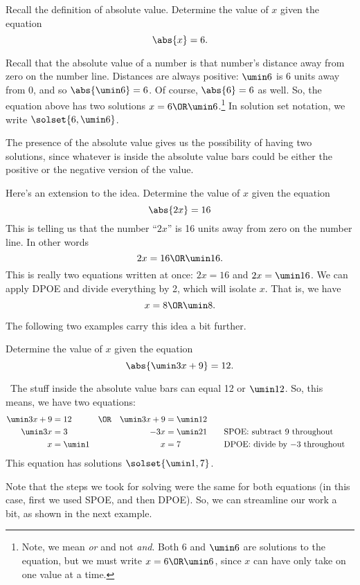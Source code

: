 \begin{boxexplore}
Recall the definition of absolute value. Determine the value of $x$ given the equation \[\abs{x} = 6.\]
\end{boxexplore} %

Recall that the absolute value of a number is that number's distance away from zero on the number line. Distances are always positive: $\umin6$ is 6 units away from 0, and so $\abs{\umin6}=6$. Of course, $\abs{6} = 6$ as well. So, the equation above has two solutions $x = 6 \OR \umin6$.\footnote{Note, we mean \textit{or} and not \textit{and}. Both 6 and $\umin6$ are solutions to the equation, but we must write $x=6 \OR \umin6$, since $x$ can have only take on one value at a time.} In solution set notation, we write $\solset{6, \umin6}$.

The presence of the absolute value gives us the possibility of having two solutions, since whatever is inside the absolute value bars could be either the positive or the negative version of the value.

Here's an extension to the idea. Determine the value of $x$ given the equation \[\abs{2x} = 16\]
This is telling us that the number ``$2x$'' is 16 units away from zero on the number line. In other words \[2x = 16 \OR \umin16.\]
This is really two equations written at once: $2x = 16$ and $2x = \umin16$. We can apply DPOE and divide everything by 2, which will isolate $x$. That is, we have \[x = 8 \OR \umin8.\]

The following two examples carry this idea a bit further.

\begin{boxex}
Determine the value of $x$ given the equation \[\abs{\umin3x+9} = 12.\]

\exsoln\ The stuff inside the absolute value bars can equal 12 or $\umin12$. So, this means, we have two equations:
\[\begin{aligned}
\umin3x + 9 &= 12 	&\OR 	&&\umin3x + 9 &= \umin12\\
\umin3x  &= 3 		&	 	&&-3x &= \umin21
&&\text{\quad SPOE: subtract 9 throughout}\\
x &= \umin1 		&	 	&&x &= 7
&&\text{\quad DPOE: divide by $-3$ throughout}\\
\end{aligned}\]
This equation has solutions $\solset{\umin1, 7}$.
\end{boxex}

Note that the steps we took for solving were the same for both equations (in this case, first we used SPOE, and then DPOE). So, we can streamline our work a bit, as shown in the next example.

